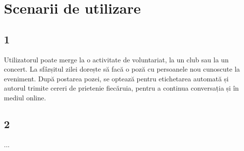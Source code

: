 \chapter{Scenarii de utilizare}
\label{Scenarii de utilizare}
    \section{1}
    \label{Scenarii de utilizare 1}
    Utilizatorul poate merge la o activitate de voluntariat, la un club sau la un concert. La sfârșitul zilei dorește să facă o poză cu persoanele nou cunoscute la eveniment. După postarea pozei, se optează pentru etichetarea automată și autorul trimite cereri de prietenie fiecăruia, pentru a continua conversația și în mediul online.
    \section{2}
    \label{Scenarii de utilizare 2}
    ...
\newpage